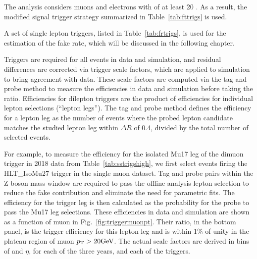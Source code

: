The \smft analysis considers muons and electrons with \pt of at least 20 \GeV. As a result,
the modified signal trigger strategy summarized in Table~\ref{tab:fttrigs} is used.

A set of single lepton triggers, listed in Table~\ref{tab:frtrigs},
is used for the estimation of the fake rate, which
will be discussed in the following chapter.



\FloatBarrier

Triggers are required for all events in data and simulation, and residual
differences are corrected via trigger scale factors, which are applied to
simulation to bring agreement with data. These scale factors are computed via
the tag and probe method to measure the efficiencies in data and simulation
before taking the ratio. Efficiencies for dilepton triggers are the product
of efficiencies for individual lepton selections (``lepton legs''). The tag
and probe method defines the efficiency for a lepton leg as the number of
events where the probed lepton candidate matches the studied lepton leg
within $\Delta R$ of 0.4, divided by the total number of selected events. 

For example, to measure the efficiency for the isolated Mu17 leg of the 
dimuon trigger in 2018 data from Table~\ref{tab:sstrigshigh}, we 
first select events firing the HLT\_IsoMu27 trigger in the 
single muon dataset. Tag and probe pairs within the Z boson mass window
are required to pass the offline analysis lepton selection to reduce 
the fake contribution and eliminate the need for parametric fits.
The efficiency for the trigger leg is then calculated as the probability 
for the probe to pass the Mu17 leg selections. These efficiencies in data and 
simulation are shown as a function of
muon \pt in Fig.~\ref{fig:triggermuonpt}. Their ratio, in the bottom panel,
is the trigger efficiency for this lepton leg and is within 1\% of unity
in the plateau region of muon $p_{\mathrm{T}} > 20\text{GeV}$.
The actual scale factors are derived in bins of \pt and $\eta$, 
for each of the three years, and each of the triggers.

